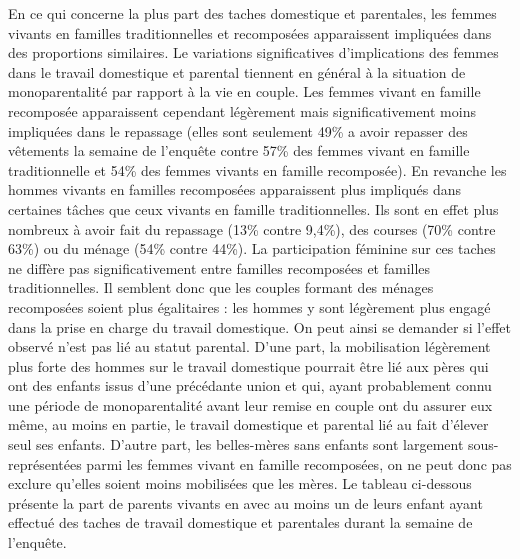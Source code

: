 \documentclass[
  12pt,
]{book}
\begin{document}
En ce qui concerne la plus part des taches domestique et parentales, les
femmes vivants en familles traditionnelles et recomposées apparaissent
impliquées dans des proportions similaires. Le variations significatives
d'implications des femmes dans le travail domestique et parental
tiennent en général à la situation de monoparentalité par rapport à la
vie en couple. Les femmes vivant en famille recomposée apparaissent
cependant légèrement mais significativement moins impliquées dans le
repassage (elles sont seulement 49\% a avoir repasser des vêtements la
semaine de l'enquête contre 57\% des femmes vivant en famille
traditionnelle et 54\% des femmes vivants en famille recomposée). En
revanche les hommes vivants en familles recomposées apparaissent plus
impliqués dans certaines tâches que ceux vivants en famille
traditionnelles. Ils sont en effet plus nombreux à avoir fait du
repassage (13\% contre 9,4\%), des courses (70\% contre 63\%) ou du
ménage (54\% contre 44\%). La participation féminine sur ces taches ne
diffère pas significativement entre familles recomposées et familles
traditionnelles. Il semblent donc que les couples formant des ménages
recomposées soient plus égalitaires : les hommes y sont légèrement plus
engagé dans la prise en charge du travail domestique. On peut ainsi se
demander si l'effet observé n'est pas lié au statut parental. D'une
part, la mobilisation légèrement plus forte des hommes sur le travail
domestique pourrait être lié aux pères qui ont des enfants issus d'une
précédante union et qui, ayant probablement connu une période de
monoparentalité avant leur remise en couple ont du assurer eux même, au
moins en partie, le travail domestique et parental lié au fait d'élever
seul ses enfants. D'autre part, les belles-mères sans enfants sont
largement sous-représentées parmi les femmes vivant en famille
recomposées, on ne peut donc pas exclure qu'elles soient moins
mobilisées que les mères. Le tableau ci-dessous présente la part de
parents vivants en avec au moins un de leurs enfant ayant effectué des
taches de travail domestique et parentales durant la semaine de
l'enquête.

\begingroup\fontsize{7}{9}\selectfont
\begingroup\fontsize{8}{10}\selectfont
\end{document}
